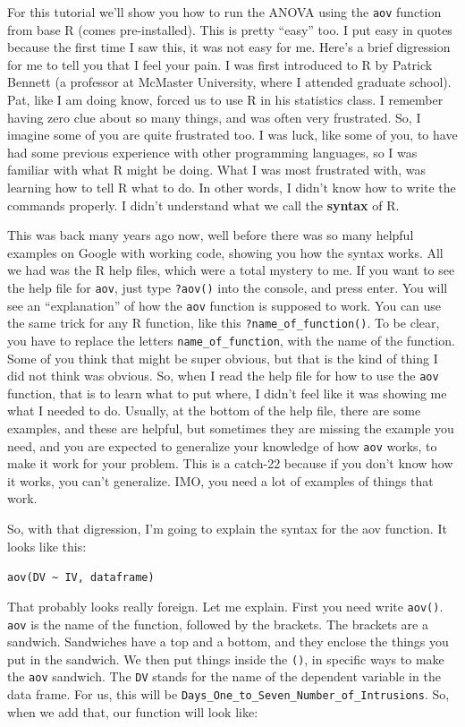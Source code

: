 \documentclass[
]{book}
\begin{document}
For this tutorial we'll show you how to run the ANOVA using the \texttt{aov} function from base R (comes pre-installed). This is pretty ``easy'' too. I put easy in quotes because the first time I saw this, it was not easy for me. Here's a brief digression for me to tell you that I feel your pain. I was first introduced to R by Patrick Bennett (a professor at McMaster University, where I attended graduate school). Pat, like I am doing know, forced us to use R in his statistics class. I remember having zero clue about so many things, and was often very frustrated. So, I imagine some of you are quite frustrated too. I was luck, like some of you, to have had some previous experience with other programming languages, so I was familiar with what R might be doing. What I was most frustrated with, was learning how to tell R what to do. In other words, I didn't know how to write the commands properly. I didn't understand what we call the \textbf{syntax} of R.

This was back many years ago now, well before there was so many helpful examples on Google with working code, showing you how the syntax works. All we had was the R help files, which were a total mystery to me. If you want to see the help file for \texttt{aov}, just type \texttt{?aov()} into the console, and press enter. You will see an ``explanation'' of how the \texttt{aov} function is supposed to work. You can use the same trick for any R function, like this \texttt{?name\_of\_function()}. To be clear, you have to replace the letters \texttt{name\_of\_function}, with the name of the function. Some of you think that might be super obvious, but that is the kind of thing I did not think was obvious. So, when I read the help file for how to use the \texttt{aov} function, that is to learn what to put where, I didn't feel like it was showing me what I needed to do. Usually, at the bottom of the help file, there are some examples, and these are helpful, but sometimes they are missing the example you need, and you are expected to generalize your knowledge of how \texttt{aov} works, to make it work for your problem. This is a catch-22 because if you don't know how it works, you can't generalize. IMO, you need a lot of examples of things that work.

So, with that digression, I'm going to explain the syntax for the aov function. It looks like this:

\texttt{aov(DV\ \textasciitilde{}\ IV,\ dataframe)}

That probably looks really foreign. Let me explain. First you need write \texttt{aov()}. \texttt{aov} is the name of the function, followed by the brackets. The brackets are a sandwich. Sandwiches have a top and a bottom, and they enclose the things you put in the sandwich. We then put things inside the \texttt{()}, in specific ways to make the \texttt{aov} sandwich. The \texttt{DV} stands for the name of the dependent variable in the data frame. For us, this will be \texttt{Days\_One\_to\_Seven\_Number\_of\_Intrusions}. So, when we add that, our function will look like:
\end{document}

